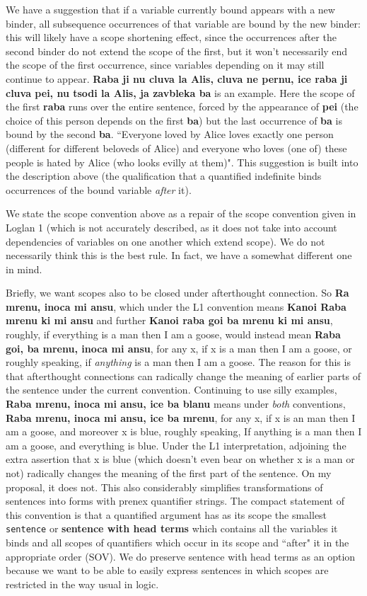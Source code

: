 \documentclass[12pt]{book}
\begin{document}
{We have a suggestion that if a variable currently bound appears with a new binder, all subsequence occurrences of that variable are bound by the new binder:  this will likely have a scope shortening effect, since the occurrences after the second binder do not extend the scope of the first, but it won't necessarily end the scope of the first occurrence, since variables depending on it may still continue to appear.  {\bf Raba ji nu cluva la Alis, cluva ne pernu, ice raba ji cluva pei, nu tsodi la Alis, ja zavbleka ba} is an example.  Here the scope of the first {\bf raba} runs over the entire sentence, forced by the appearance of {\bf pei} (the choice of this person depends on the first {\bf ba}) but the last occurrence of {\bf ba} is bound by the second {\bf ba}.
``Everyone loved by Alice loves exactly one person (different for different beloveds of Alice) and everyone who loves (one of) these people is hated by Alice (who looks evilly at them)".  This suggestion is built into the description above (the qualification that a quantified indefinite binds occurrences of the bound variable {\em after} it).

We state the scope convention above as a repair of the scope convention given in Loglan 1 (which is not accurately described, as it does not take into account dependencies of variables on one another which extend scope).  We do not necessarily think this is the best rule.  In fact, we have a somewhat different one in mind.

Briefly, we want scopes also to be closed under afterthought connection.  So {\bf Ra mrenu, inoca mi ansu}, which under the L1 convention means {\bf Kanoi Raba mrenu ki mi ansu} and further {\bf Kanoi raba goi ba mrenu ki mi ansu}, roughly, if everything is a man then I am a goose, would instead mean {\bf Raba goi, ba mrenu, inoca mi ansu}, for any x, if x is a man then I am a goose, or roughly speaking, if {\em anything} is a man then I am a goose.  The reason for this is that afterthought connections can radically change the meaning of earlier parts of the sentence under the current convention.  Continuing to use silly examples, {\bf Raba mrenu, inoca mi ansu, ice ba blanu} means under {\em both} conventions,
{\bf Raba mrenu, inoca mi ansu, ice ba mrenu}, for any x, if x is an man then I am a goose, and moreover x is blue, roughly speaking, If anything is a man then I am a goose, and everything is blue.  Under the L1 interpretation, adjoining the extra assertion that x is blue (which doesn't even bear on whether x is a man or not) radically changes the meaning of the first part of the sentence.  On my proposal, it does not.  This also considerably simplifies transformations of sentences into forms with prenex quantifier strings.  The compact statement of this convention is that a quantified argument has as its scope the smallest {\tt sentence} or {\bf sentence with head terms} which contains all the variables it binds and all scopes of quantifiers which occur in its scope and ``after" it in the appropriate order (SOV).  We do preserve sentence with head terms as an option because we want to be able to easily express sentences in which scopes are restricted in the way usual in logic.

}
\end{document}
